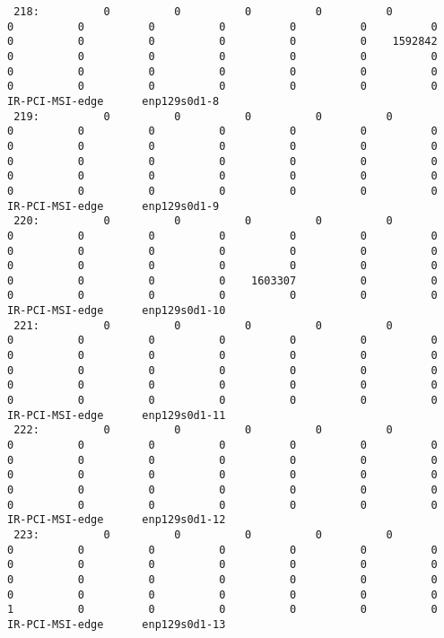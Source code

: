 \begin{lstlisting}
 218:          0          0          0          0          0          0          0          0          0          0          0          0          0          0          0          0          0          0    1592842          0          0          0          0          0          0          0          0          0          0          0          0          0          0          0          0          0          0          0          0          0  IR-PCI-MSI-edge      enp129s0d1-8
 219:          0          0          0          0          0          0          0          0          0          0          0          0          0          0          0          0          0          0          0          0          0          0          0          0          0          0          0          0          0          0          0          0          0          0          0          0          0          0          0          0  IR-PCI-MSI-edge      enp129s0d1-9
 220:          0          0          0          0          0          0          0          0          0          0          0          0          0          0          0          0          0          0          0          0          0          0          0          0          0          0          0          0          0          0    1603307          0          0          0          0          0          0          0          0          0  IR-PCI-MSI-edge      enp129s0d1-10
 221:          0          0          0          0          0          0          0          0          0          0          0          0          0          0          0          0          0          0          0          0          0          0          0          0          0          0          0          0          0          0          0          0          0          0          0          0          0          0          0          0  IR-PCI-MSI-edge      enp129s0d1-11
 222:          0          0          0          0          0          0          0          0          0          0          0          0          0          0          0          0          0          0          0          0          0          0          0          0          0          0          0          0          0          0          0          0          0          0          0          0          0          0          0          0  IR-PCI-MSI-edge      enp129s0d1-12
 223:          0          0          0          0          0          0          0          0          0          0          0          0          0          0          0          0          0          0          0          0          0          0          0          0          0          0          0          0          0          0          0          0          0          1          0          0          0          0          0          0  IR-PCI-MSI-edge      enp129s0d1-13

\end{lstlisting}
